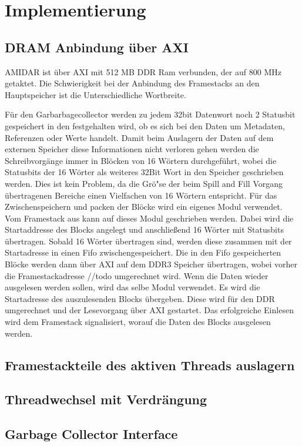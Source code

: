 \chapter{Implementierung}
\label{cha:Implementierung}
\section{DRAM Anbindung \"uber AXI}
AMIDAR ist \"uber AXI mit 512 MB DDR Ram verbunden, der auf 800 MHz getaktet.
Die Schwierigkeit bei der Anbindung des Framestacks an den Hauptspeicher ist die Unterschiedliche Wortbreite. 

F\"ur den Garbarbagecollector werden zu jedem 32bit Datenwort noch 2 Statusbit gespeichert in den festgehalten wird, ob es sich bei den Daten um Metadaten, Referenzen oder Werte handelt. Damit beim Auslagern der Daten auf dem externen Speicher diese Informationen nicht verloren gehen werden die Schreibvorg\"ange immer in Bl\"ocken von 16 W\"ortern durchgef\"uhrt, wobei die Statusbits der 16 W\"orter als weiteres 32Bit Wort in den Speicher geschrieben werden. Dies ist kein Problem, da die Gr\"o"se der beim Spill and Fill Vorgang \"ubertragenen Bereiche einen Vielfachen von 16 W\"ortern entspricht. 
F\"ur das Zwischenspeichern und packen der Bl\"ocke wird ein eigenes Modul verwendet.
Vom Framestack aus kann auf dieses Modul geschrieben werden. Dabei wird die Startaddresse des Blocks angelegt und anschließend 16 W\"orter mit Statusbits \"ubertragen. Sobald 16 W\"orter \"ubertragen sind, werden diese zusammen mit der Startadresse in einen Fifo zwischengespeichert. Die in den Fifo gespeicherten Bl\"ocke werden dann \"uber AXI auf dem DDR3 Speicher \"ubertragen, wobei vorher die Framestackadresse //todo umgerechnet wird. 
Wenn die Daten wieder ausgelesen werden sollen, wird das selbe Modul verwendet. Es wird die Startadresse des auszulesenden Blocks \"ubergeben. Diese wird f\"ur den DDR umgerechnet und der Lesevorgang \"uber AXI gestartet. Das erfolgreiche Einlesen wird dem Framestack signalisiert, worauf die Daten des Blocks ausgelesen werden. 

\section{Framestackteile des aktiven Threads auslagern}

\section{Threadwechsel mit Verdr\"angung}

\section{Garbage Collector Interface}